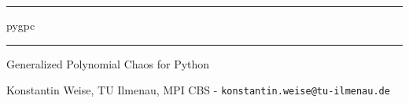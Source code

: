 \documentclass[]{article}
\begin{document}
\begin{center}
		
\thispagestyle{empty}
\vspace{13mm}
		
\hrule
		
\vspace{13mm}
\Huge{pygpc}
\vspace{13mm}
		
\hrule
		
\vspace{3mm}
\Large{Generalized Polynomial Chaos for Python}
\vspace{3mm}
		
\normalsize Konstantin Weise, TU Ilmenau, MPI CBS - \texttt{konstantin.weise@tu-ilmenau.de}
		
\end{center}

\newpage

\tableofcontents

\newpage






\end{document}
